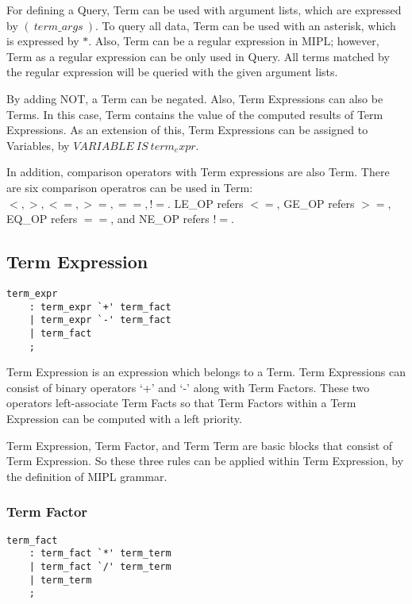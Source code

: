 \documentclass[prodmode,acmtecs]{acmsmall}
\begin{document}
For defining a Query, Term can be used with argument lists, which are expressed by
$(\ term\_args\ )$. To query all data, Term can be used with an asterisk, which
is expressed by $*$. Also, Term can be a regular expression in MIPL; however,
Term as a regular expression can be only used in Query. All terms matched by the
regular expression will be queried with the given argument lists.
\medskip

By adding NOT, a Term can be negated. Also, Term Expressions can also be Terms.
In this case, Term contains the value of the computed results of Term Expressions.
As an extension of this, Term Expressions can be assigned to Variables,
by $VARIABLE\ IS\ term_expr$.
\medskip

In addition, comparison operators with Term expressions are also Term. There are six
comparison operatros can be used in Term: $<, >, <=, >=, ==, !=$. LE\_OP refers $<=$,
GE\_OP refers $>=$, EQ\_OP refers $==$, and NE\_OP refers $!=$.
\medskip


\subsection{Term Expression}
\begin{lstlisting}
term_expr
	: term_expr `+' term_fact
	| term_expr `-' term_fact
	| term_fact
	;
\end{lstlisting}

Term Expression is an expression which belongs to a Term.  Term 
Expressions can consist of binary operators `+' and `-' along with Term
Factors. These two operators left-associate Term Facts so that Term
Factors within a Term Expression can be computed with a left priority.

Term Expression, Term Factor, and Term Term are basic blocks that
consist of Term Expression.  So these three rules can be applied within
Term Expression, by the definition of MIPL grammar.
\medskip

\subsubsection{Term Factor}

\begin{lstlisting}
term_fact
	: term_fact `*' term_term
	| term_fact `/' term_term
	| term_term
	;
\end{lstlisting}
\end{document}
